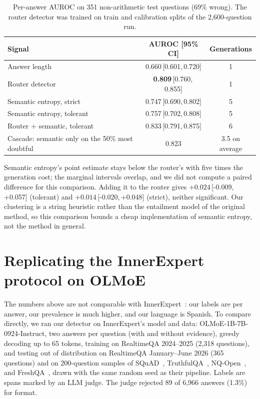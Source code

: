 \documentclass[11pt]{article}
\newcommand{\ci}[2]{\,[#1,\,#2]}
\begin{document}
\begin{table}[t]
\centering
\small
\caption{Per-answer AUROC on 351 non-arithmetic test questions (69\% wrong). The router detector was trained on train and calibration splits of the 2,600-question run.}
\label{tab:semantic}
\begin{tabular}{lcc}
\toprule
Signal & AUROC [95\% CI] & Generations \\
\midrule
Answer length & 0.660\ci{0.601}{0.720} & 1 \\
Router detector & \textbf{0.809}\ci{0.760}{0.855} & 1 \\
Semantic entropy, strict & 0.747\ci{0.690}{0.802} & 5 \\
Semantic entropy, tolerant & 0.757\ci{0.702}{0.808} & 5 \\
Router + semantic, tolerant & 0.833\ci{0.791}{0.875} & 6 \\
Cascade: semantic only on the 50\% most doubtful & 0.823 & 3.5 on average \\
\bottomrule
\end{tabular}
\end{table}

Semantic entropy's point estimate stays below the router's with five times the generation cost; the marginal intervals overlap, and we did not compute a paired difference for this comparison.
Adding it to the router gives $+0.024$\ci{-0.009}{+0.057} (tolerant) and $+0.014$\ci{-0.020}{+0.048} (strict), neither significant.
Our clustering is a string heuristic rather than the entailment model of the original method, so this comparison bounds a cheap implementation of semantic entropy, not the method in general.

\section{Replicating the InnerExpert protocol on OLMoE}
\label{sec:innerexpert}

The numbers above are not comparable with InnerExpert~\citep{fonseca2026innerexpert}: our labels are per answer, our prevalence is much higher, and our language is Spanish.
To compare directly, we ran our detector on InnerExpert's model and data: OLMoE-1B-7B-0924-Instruct, two answers per question (with and without evidence), greedy decoding up to 65 tokens, training on RealtimeQA 2024--2025 (2,318 questions), and testing out of distribution on RealtimeQA January--June 2026 (365 questions) and on 200-question samples of SQuAD~\citep{rajpurkar2016squad}, TruthfulQA~\citep{lin2022truthfulqa}, NQ-Open~\citep{kwiatkowski2019natural,lee2019latent}, and FreshQA~\citep{vu2024freshllms}, drawn with the same random seed as their pipeline.
Labels are spans marked by an LLM judge.
The judge rejected 89 of 6,966 answers (1.3\%) for format.
\end{document}
